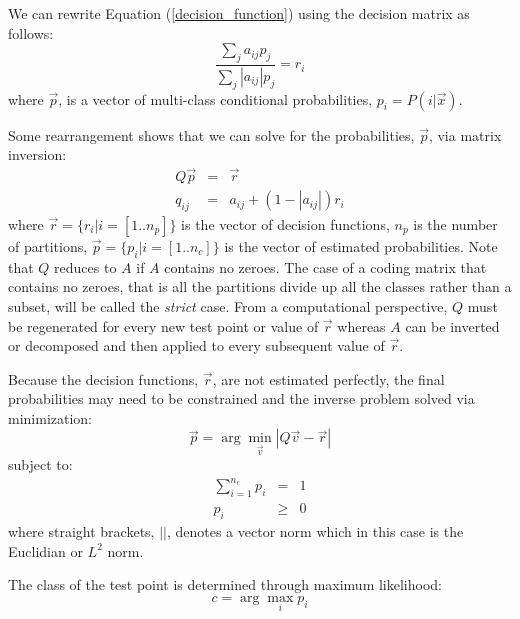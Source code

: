 \documentclass{article}
\begin{document}
We can rewrite Equation (\ref{decision_function}) using the decision
matrix as follows:
\begin{equation}
	\frac{\sum_j a_{ij} p_j}{\sum_j |a_{ij}| p_j} = r_i
	\label{non_hier}
\end{equation}
where $\vec p$, is a vector of multi-class conditional probabilities, $p_i=P(i|\vec x)$.

Some rearrangement shows that
we can solve for the probabilities, $\vec p$, via matrix inversion:
\begin{eqnarray}
	Q \vec p & = & \vec r \label{basic_system}\\
	q_{ij} & = & a_{ij} + (1-|a_{ij}|) r_i 
	\label{matrix_equation2}
\end{eqnarray}
where $\vec r=\lbrace r_i| i=[1..n_p]\rbrace$ 
is the vector of decision functions, 
$n_p$ is the number of partitions,
$\vec p =\lbrace p_i | i=[1..n_c]\rbrace$
is the vector of estimated probabilities.
Note that $Q$ reduces to $A$ if $A$ contains no zeroes.
The case of a coding matrix that contains no zeroes, that is all the partitions divide up all the
classes rather than a subset, will be called the {\it strict} case.
From a computational perspective, 
$Q$ must be regenerated for every new test point or value of $\vec r$ 
whereas $A$ can be inverted or decomposed and then
applied to every subsequent value of $\vec r$.

Because the decision functions, $\vec r$, are not estimated perfectly,
the final probabilities may need to be constrained and the inverse
problem solved via minimization:
\begin{equation}
	\vec p = \arg \min_{\vec v} | Q \vec v - \vec r | \label{minimization_problem}
\end{equation}
subject to:
\begin{eqnarray}
	\sum_{i=1}^{n_c} p_i & = & 1 \label{first_constraint}\\
	p_i & \ge & 0 \label{constraints}
\end{eqnarray}
where straight brackets, $||$, denotes a vector norm which  
in this case is the Euclidian or $L^2$ norm.

The class of the test point is determined through maximum likelihood:
\begin{equation}
	c = \arg \max_i p_i
\end{equation}
\end{document}
